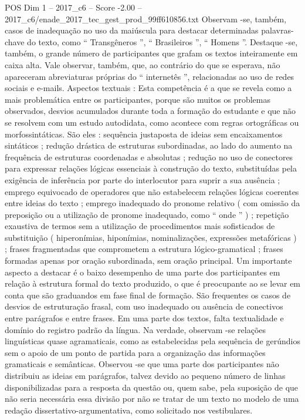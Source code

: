 \begin{textsample}{POS Dim 1 – 2017\_c6 – Score -2.00 – 2017\_c6/enade\_2017\_tec\_gest\_prod\_99ff610856.txt}
Observam -se, também, casos de inadequação no uso da maiúscula para destacar determinadas palavras-chave do texto, como “ Transgêneros ”, “ Brasileiros ”, “ Homens ”.
Destaque -se, também, o grande número de participantes que grafam os textos inteiramente em caixa alta.
Vale observar, também, que, ao contrário do que se esperava, não apareceram abreviaturas próprias do “ internetês ”, relacionadas ao uso de redes sociais e e-mails.
Aspectos textuais : Esta competência é a que se revela como a mais problemática entre os participantes, porque são muitos os problemas observados, desvios acumulados durante toda a formação do estudante e que não se resolvem com um estudo autodidata, como acontece com regras ortográficas ou morfossintáticas.
São eles : sequência justaposta de ideias sem encaixamentos sintáticos ; redução drástica de estruturas subordinadas, ao lado do aumento na frequência de estruturas coordenadas e absolutas ; redução no uso de conectores para expressar relações lógicas essenciais à construção do texto, substituídas pela exigência de inferência por parte do interlocutor para suprir a sua ausência ; emprego equivocado de operadores que não estabelecem relações lógicas coerentes entre ideias do texto ; emprego inadequado do pronome relativo ( com omissão da preposição ou a utilização de pronome inadequado, como “ onde ” ) ; repetição exaustiva de termos sem a utilização de procedimentos mais sofisticados de substituição ( hiperonímias, hiponímias, nominalizações, expressões metafóricas ) ; frases fragmentadas que comprometem a estrutura lógico-gramatical ; frases formadas apenas por oração subordinada, sem oração principal.
Um importante aspecto a destacar é o baixo desempenho de uma parte dos participantes em relação à estrutura formal do texto produzido, o que é preocupante ao se levar em conta que são graduandos em fase final de formação.
São frequentes os casos de desvios de estruturação frasal, com uso inadequado ou ausência de conectivos entre parágrafos e entre frases.
Em uma parte dos textos, falta textualidade e domínio do registro padrão da língua.
Na verdade, observam -se relações linguísticas quase agramaticais, como as estabelecidas pela sequência de gerúndios sem o apoio de um ponto de partida para a organização das informações gramaticais e semânticas.
Observou -se que uma parte dos participantes não distribuiu as ideias em parágrafos, talvez devido ao pequeno número de linhas disponibilizadas para a resposta da questão ou, quem sabe, pela suposição de que não seria necessária essa divisão por não se tratar de um texto no modelo de uma redação dissertativo-argumentativa, como solicitado nos vestibulares.

\end{textsample}
